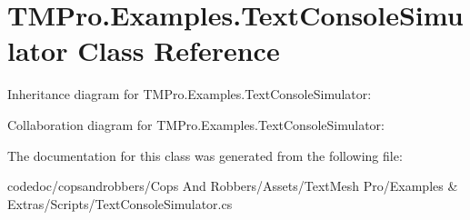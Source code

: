 \hypertarget{classTMPro_1_1Examples_1_1TextConsoleSimulator}{}\section{T\+M\+Pro.\+Examples.\+Text\+Console\+Simulator Class Reference}
\label{classTMPro_1_1Examples_1_1TextConsoleSimulator}


Inheritance diagram for T\+M\+Pro.\+Examples.\+Text\+Console\+Simulator\+:


Collaboration diagram for T\+M\+Pro.\+Examples.\+Text\+Console\+Simulator\+:


The documentation for this class was generated from the following file\+:\begin{DoxyCompactItemize}
\item 
codedoc/copsandrobbers/\+Cops And Robbers/\+Assets/\+Text\+Mesh Pro/\+Examples \& Extras/\+Scripts/Text\+Console\+Simulator.\+cs\end{DoxyCompactItemize}
